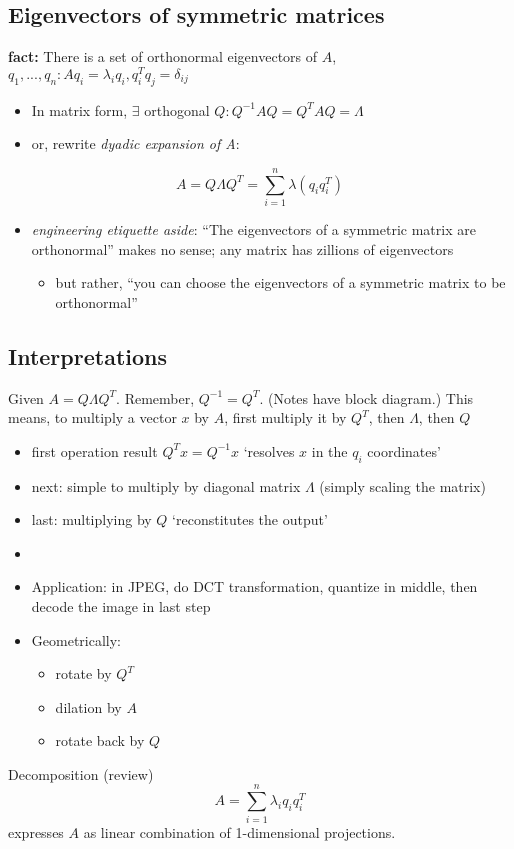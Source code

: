 \documentclass[10pt,letterpaper]{article}
\begin{document}
\subsection{Eigenvectors of symmetric matrices}
\label{sec-14_2}

\textbf{fact:} There is a set of orthonormal eigenvectors of $A$, $q_1,...,q_n: Aq_i=\lambda_i q_i, q_i ^{T} q_j = \delta _{ij}$ 
\begin{itemize}
\item In matrix form, $\exists$ orthogonal $Q: Q ^{-1} AQ = Q ^{T} AQ = \Lambda$
\item or, rewrite \emph{dyadic expansion of A}:
\end{itemize}
$$
A = Q \Lambda Q ^{T} = \sum ^{n} _{i=1} \lambda (q_i q_i ^{T})
$$
\begin{itemize}
\item \emph{engineering etiquette aside}: ``The eigenvectors of a symmetric matrix are orthonormal'' makes no sense; any matrix has zillions of eigenvectors

\begin{itemize}
\item but rather, ``you can choose the eigenvectors of a symmetric matrix to be orthonormal''
\end{itemize}

\end{itemize}
\subsection{Interpretations}
\label{sec-14_3}

Given $A=Q \Lambda Q ^{T}$. Remember, $Q ^{-1} =Q ^{T}$. (Notes have block diagram.)
This means, to multiply a vector $x$ by $A$, first multiply it by $Q^T$, then $\Lambda$, then $Q$
\begin{itemize}
\item first operation result $Q ^{T} x=Q ^{-1} x$ `resolves $x$ in the $q_i$ coordinates'
\item next: simple to multiply by diagonal matrix $\Lambda$ (simply scaling the matrix)
\item last: multiplying by $Q$ `reconstitutes the output'
\item {}
\item Application: in JPEG, do DCT transformation, quantize in middle, then decode the image in last step
\item Geometrically:

\begin{itemize}
\item rotate by $Q^T$
\item dilation by $A$
\item rotate back by $Q$
\end{itemize}

\end{itemize}
Decomposition (review)
$$ 
A = \sum ^{n} _{i=1} \lambda _{i} q _{i} q _{i} ^{T} 
$$
expresses $A$ as linear combination of 1-dimensional projections.
\end{document}
